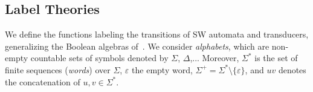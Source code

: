 %
%
\subsection{Label Theories} 
We define the functions labeling the transitions of SW automata and transducers,
generalizing the Boolean algebras of~\cite{Veanes12symbolic,dAntoniVeanes17CAV}.
%
We consider \emph{alphabets}, which are non-empty countable 
sets of symbols
denoted by $\Sigma$, $\Delta$,...
Moreover, $\Sigma^*$ is the set of finite sequences (\emph{words}) over
$\Sigma$, $\varepsilon$ the empty word, $\Sigma^+ = \Sigma^* \setminus \{ \varepsilon \}$,
and $u v$ denotes the concatenation of $u, v \in \Sigma^*$.


